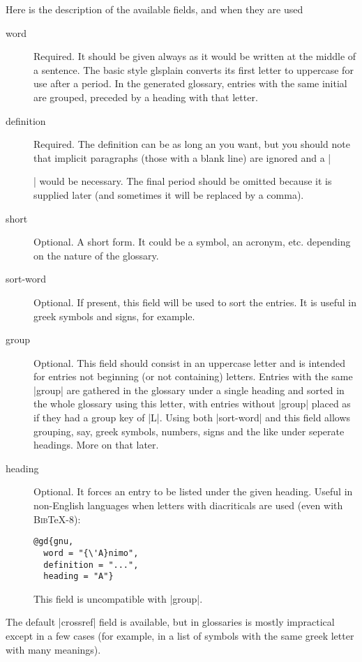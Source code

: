 \documentclass{ltxguide}
\newcommand{\bibTeX}{\textsc{Bib}\TeX}
\begin{document}
Here is the description of the available fields, and when they are used
\begin{description}
\item[word] Required.  It should be given always as it would be 
  written at the middle of a sentence.  The basic style 
  \textsf{glsplain} converts its first letter to uppercase for use after 
  a period.  In the generated glossary, entries with the 
  same initial are grouped, preceded by a heading with that letter.

\item[definition] Required.  The definition can be as long an you 
  want, but you should note that implicit paragraphs (those with a 
  blank line) are ignored and a |\par| would be necessary.  The final 
  period should be omitted because it is supplied later (and sometimes it 
  will be replaced by a comma).

\item[short] Optional. A short form. It could be a symbol, an
  acronym, etc. depending on the nature of the glossary.

\item[sort-word] Optional.  If present, this field will be used to 
sort the entries.  It is useful in greek symbols and signs, for 
example.

\item[group] Optional.  This field should consist in an uppercase 
  letter and is intended for entries not beginning (or not containing) 
  letters.  Entries with the same |group| are gathered in the glossary 
  under a single heading and sorted in the whole glossary using this 
  letter, with entries without |group| placed as if they had a group 
  key of |L|.  Using both |sort-word| and this field allows grouping, 
  say, greek symbols, numbers, signs and the like under seperate 
  headings.  More on that later.

\item[heading] Optional. It forces an entry to be listed under the
  given heading. Useful in non-English languages when
  letters with diacriticals are used (even with \bibTeX-8):
\begin{verbatim}
@gd{gnu,
  word = "{\'A}nimo",
  definition = "...",
  heading = "A"}
\end{verbatim}
This field is uncompatible with |group|.

\end{description}

The default |crossref| field is available, but in glossaries is mostly 
impractical except in a few cases (for example, in a list of symbols 
with the same greek letter with many meanings).
\end{document}
